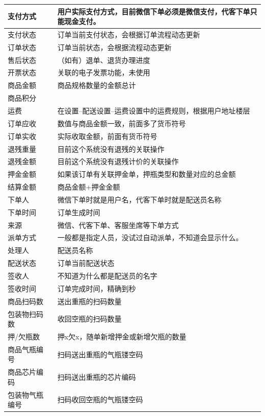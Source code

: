 \documentclass[UTF8]{ctexart}
\begin{document}
\begin{longtable}[h!]{ | m{3cm} | m{12cm} | }
		\hline
		支付方式& 用户实际支付方式，目前微信下单必须是微信支付，代客下单只能现金支付。\\
		\hline
		支付状态& 订单当前支付状态，会根据订单流程动态更新\\
		\hline
		订单状态& 订单当前状态，会根据流程动态更新\\
		\hline
		售后状态& （如有）退单、退货办理进度\\
		\hline
		开票状态& 关联的电子发票功能，未使用\\
		\hline
		商品金额& 商品规格数量的金额总计 \\
		\hline
		商品积分& \\
		\hline
		运费& 在设置--配送设置--运费设置中的运费规则，根据用户地址楼层\\
		\hline
		订单应收& 数值与商品金额一致，前面多了货币符号\\
		\hline
		订单实收& 实际收取金额，前面有货币符号\\
		\hline
		退残重量& 目前这个系统没有退残的关联操作\\
		\hline
		退残金额& 目前这个系统没有退残计价的关联操作\\
		\hline
		押金金额& 如果该订单有关联押金单，押瓶类型和数量对应的总金额\\
		\hline
		结算金额& 商品金额+押金金额\\
		\hline
		下单人& 微信下单时就是用户名，代客下单时就是配送员名称\\
		\hline
		下单时间& 订单生成时间\\
		\hline
		来源& 微信、代客下单、客服坐席等下单方式\\
		\hline
		派单方式& 一般都是指定人员，没试过自动派单，不知道会显示什么。\\
		\hline
		处理人& 配送员名称\\
		\hline
		配送状态& 订单当前配送状态\\
		\hline
		签收人& 不知道为什么都是配送员的名字\\
		\hline
		签收时间& 订单完成时间，精确到秒\\
		\hline
		商品扫码数& 送出重瓶的扫码数量\\
		\hline
		包装物扫码数& 收回空瓶的扫码数量\\
		\hline
		押/欠瓶数& 押x欠x，随单新增押金或新增欠瓶的数量\\
		\hline
		商品气瓶编号& 扫码送出重瓶的气瓶镂空码\\
		\hline
		商品芯片编码& 扫码送出重瓶的芯片编码\\
		\hline
		包装物气瓶编号& 扫码收回空瓶的气瓶镂空码\\

\end{longtable}
\end{document}
